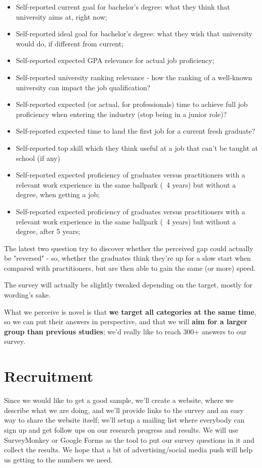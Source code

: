 \documentclass{sigchi}
\begin{document}
\begin{itemize}
	\item Self-reported current goal for bachelor's degree: what they think that university aims at, right now;
\item Self-reported ideal goal for bachelor's degree: what they wish that university would do, if different from current;
\item Self-reported expected GPA relevance for actual job proficiency;
\item Self-reported university ranking relevance - how the ranking of a well-known university can impact the job qualification?
\item Self-reported expected (or actual, for professionals) time to achieve full job proficiency when entering the industry (stop being in a junior role)?
\item Self-reported expected time to land the first job for a current fresh graduate?
\item Self-reported top skill which they think useful at a job that can't be taught at school (if any)
\item Self-reported expected proficiency of graduates versus practitioners with a relevant work experience in the same ballpark (~4 years) but without a degree, when getting a job;
\item Self-reported expected proficiency of graduates versus practitioners with a relevant work experience in the same ballpark (~4 years) but without a degree, after 5 years;
\end{itemize}

The latest two question try to discover whether the perceived gap could actually be "reversed" - so, whether the graduates think they're up for a slow start when compared with practitioners, but are then able to gain the same (or more) speed.
 
The survey will actually be slightly tweaked depending on the target, mostly for wording's sake.
 
 What we perceive is novel is that \textbf{we target all categories at the same time}, so we can put their answers in perspective, and that we will \textbf{aim for a larger group than previous studies}; we'd really like to reach 300+ answers to our survey.
 
\section{Recruitment}
Since we would like to get a good sample, we'll create a website, where we describe what we are doing, and we'll provide links to the survey and an easy way to share the website itself; we'll setup a mailing list where everybody can sign up and get follow ups on our research progress and results. We will use SurveyMonkey or Google Forms as the tool to put our survey questions in it and collect the results. We hope that a bit of advertising/social media push will help us getting to the numbers we need. 
\end{document}
